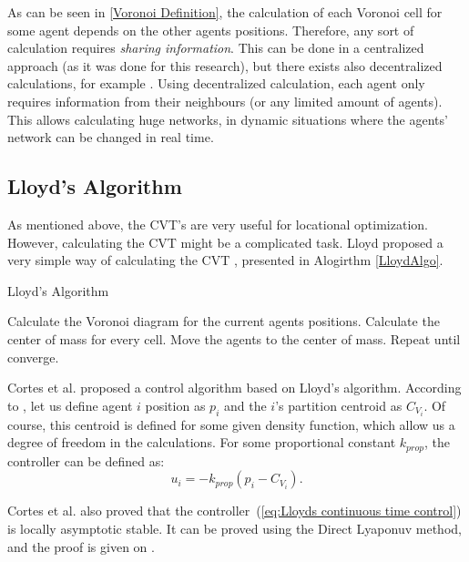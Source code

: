 \documentclass{iacas}
\begin{document}
As can be seen in \eqref{Voronoi Definition}, the calculation of each Voronoi cell for some agent depends on the other agents positions. Therefore, any sort of calculation requires \emph{sharing information}. This can be done in a centralized approach (as it was done for this research), but there exists also decentralized calculations, for example \cite{Adams2009}. Using decentralized calculation, each agent only requires information from their neighbours (or any limited amount of agents). This allows calculating huge networks, in dynamic situations where the agents' network can be changed in real time.%

\subsection{Lloyd's Algorithm}
As mentioned above, the CVT's are very useful for locational optimization. However, calculating the CVT might be a complicated task. Lloyd proposed a very simple way of calculating the CVT \cite{Lloyd1982}, presented in Alogirthm \ref{LloydAlgo}. 
\begin{algorithm}
\caption{Lloyd's Algorithm}\label{LloydAlgo}
\begin{algorithmic}[1]
\State Calculate the Voronoi diagram for the current agents positions.
\State Calculate the center of mass for every cell.
\State Move the agents to the center of mass.
\State Repeat until converge.
\end{algorithmic}
\label{algo:lloyd's algorithm}
\end{algorithm}

Cortes et al. \cite{Cortes2004} proposed a control algorithm based on Lloyd's algorithm. According to \cite{Cortes2004}, let us define agent $i$ position as $p_i$ and the $i$'s partition centroid as $C_{V_{i}}$. Of course, this centroid is defined for some given density function, which allow us a degree of freedom in the calculations. For some proportional constant $k_{prop}$, the controller can be defined as:
\begin{equation} \label{eq:Lloyds continuous time control}
u_{i} = -k_{prop}\left( p_i - C_{V_{i}} \right).
\end{equation} 

Cortes et al. \cite{Cortes2004} also proved that the controller~(\ref{eq:Lloyds continuous time control}) is locally asymptotic stable. It can be proved using the Direct Lyaponuv method, and the proof is given on \cite{Cortes2004}.
\end{document}
